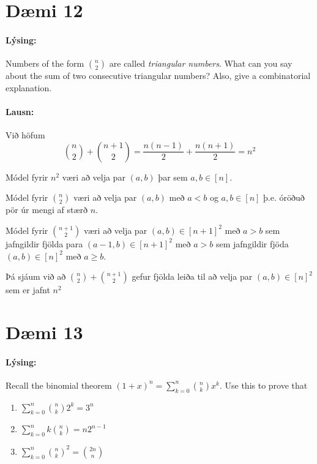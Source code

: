 \documentclass[a4paper,notitlepage]{article}
\theoremstyle{plain}
\theoremstyle{definition}
\begin{document}
\newpage

\section*{Dæmi 12}
\paragraph{Lýsing:}
Numbers of the form $\binom{n}{2}$ are called \emph{triangular numbers}. What can you say about the sum of two consecutive triangular numbers? Also, give a combinatorial explanation.

\paragraph{Lausn:}

Við höfum
\begin{equation*}
    \binom{n}{2} + \binom{n+1}{2} = \frac{n(n-1)}{2} + \frac{n(n+1)}{2} = n^2
\end{equation*}

Módel fyrir $n^2$ væri að velja par $(a,b)$ þar sem $a,b\in[n]$.

Módel fyrir $\binom{n}{2}$ væri að velja par $(a,b)$ með $a<b$ og $a,b\in[n]$ þ.e. óröðuð pör úr mengi af stærð $n$.

Módel fyrir $\binom{n+1}{2}$ væri að velja par $(a,b)\in[n+1]^2$ með $a>b$ sem jafngildir fjölda para $(a-1, b)\in[n+1]^2$ með $a > b$ sem jafngildir fjöda $(a,b)\in[n]^2$ með $a \geq b$.

Þá sjáum við að $\binom{n}{2}+\binom{n+1}{2}$ gefur fjölda leiða til að velja par $(a,b)\in[n]^2$ sem er jafnt $n^2$

\section*{Dæmi 13}
\paragraph{Lýsing:}
Recall the binomial theorem $\displaystyle (1+x)^n = \sum_{k=0}^n\binom{n}{k}x^k$. Use this to prove that
\begin{enumerate}
    \item $\displaystyle \sum_{k=0}^n \binom{n}{k}2^k = 3^n$
    \item $\displaystyle \sum_{k=0}^n k \binom{n}{k} = n2^{n-1}$
    \item $\displaystyle \sum_{k=0}^n \binom{n}{k}^2 = \binom{2n}{n}$
\end{enumerate}
\end{document}
